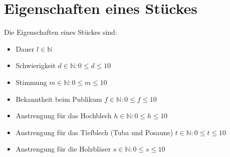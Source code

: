 \section{Eigenschaften eines Stückes}\label{sec:settings}
Die Eigenschaften eines Stückes sind: 
\begin{itemize}
    \item Dauer $l \in \mathbb{N}$
    \item Schwierigkeit $ d \in \mathbb{N}: 0 \leq d \leq 10$
    \item Stimmung $ m \in \mathbb{N}: 0 \leq m \leq 10$
    \item Bekanntheit beim Publikum $ f \in \mathbb{N}: 0 \leq f \leq 10$
    \item Anstrengung für das Hochblech $ h \in \mathbb{N}: 0 \leq h \leq 10$
    \item Anstrengung für das Tiefblech (Tuba und Posaune) $ t \in \mathbb{N}: 0 \leq t \leq 10$
    \item Anstrengung für die Holzbläser $ s \in \mathbb{N}: 0 \leq s \leq 10$
\end{itemize}